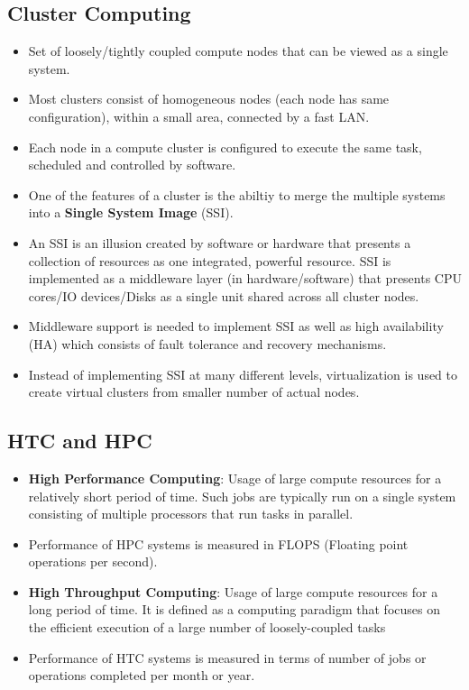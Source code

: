 \documentclass{article}
\begin{document}
\subsection{Cluster Computing}
\begin{itemize}
    \item Set of loosely/tightly coupled compute nodes that can be viewed as a single system. 
    
    \item Most clusters consist of homogeneous nodes (each node has same configuration), within a small area, connected by a fast LAN. 
    
    \item Each node in a compute cluster is configured to execute the same task, scheduled and controlled by software. 
    
    \item One of the features of a cluster is the abiltiy to merge the multiple systems into a \textbf{Single System Image} (SSI). 
    
    \item An SSI is an illusion created by software or hardware that presents a collection of resources as one integrated, powerful resource. SSI is implemented as a middleware layer (in hardware/software) that presents CPU cores/IO devices/Disks as a single unit shared across all cluster nodes. 
    
    \item Middleware support is needed to implement SSI as well as high availability (HA) which consists of fault tolerance and recovery mechanisms.
    
    \item Instead of implementing SSI at many different levels, virtualization is used to create virtual clusters from smaller number of actual nodes. 
\end{itemize}

\subsection{HTC and HPC}
\begin{itemize}
    \item \textbf{High Performance Computing}: Usage of large compute resources for a relatively short period of time. Such jobs are typically run on a single system consisting of multiple processors that run tasks in parallel. 
    
    \item Performance of HPC systems is measured in FLOPS (Floating point operations per second).
    
    \item \textbf{High Throughput Computing}: Usage of large compute resources for a long period of time. It is defined as a computing paradigm that focuses on the efficient execution of a large number of loosely-coupled tasks
    
    \item Performance of HTC systems is measured in terms of number of jobs or operations completed per month or year. 
\end{itemize}
\end{document}

